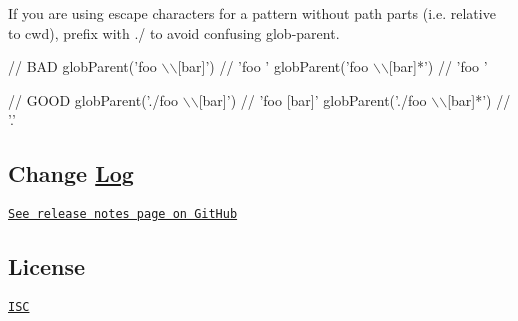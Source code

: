 If you are using escape characters for a pattern without path parts (i.\+e. relative to {\ttfamily cwd}), prefix with {\ttfamily ./} to avoid confusing glob-\/parent.


\begin{DoxyCode}
// BAD
globParent('foo \(\backslash\)\(\backslash\)[bar]') // 'foo '
globParent('foo \(\backslash\)\(\backslash\)[bar]*') // 'foo '

// GOOD
globParent('./foo \(\backslash\)\(\backslash\)[bar]') // 'foo [bar]'
globParent('./foo \(\backslash\)\(\backslash\)[bar]*') // '.'
\end{DoxyCode}


\subsection*{Change \mbox{\hyperlink{classLog}{Log}} }

\href{https://github.com/es128/glob-parent/releases}{\tt See release notes page on Git\+Hub}

\subsection*{License }

\href{https://raw.github.com/es128/glob-parent/master/LICENSE}{\tt I\+SC} 
